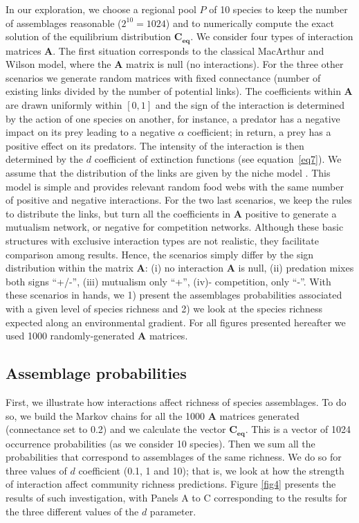 In our exploration, we choose a regional pool $P$ of 10 species to keep the number of assemblages reasonable ($2^{10}=1024$) and to numerically compute the exact solution of the equilibrium distribution $\mathbf{C_{eq}}$. We consider four types of interaction matrices $\mathbf{A}$. The first situation corresponds to the classical MacArthur and Wilson model, where the $\mathbf{A}$ matrix is null (no interactions). For the three other scenarios we generate random matrices with fixed connectance (number of existing links divided by the number of potential links). The coefficients within $\mathbf{A}$ are drawn uniformly within $[0,1]$ and the sign of the interaction is determined by the action of one species on another, for instance, a predator has a negative impact on its prey leading to a negative $\alpha$ coefficient; in return, a prey has a positive effect on its predators. The intensity of the interaction is then determined by the $d$ coefficient of extinction functions (see equation~\eqref{eq7}). We assume that the distribution of the links are given by the niche model \citep{Williams2000Simple}. This model is simple and provides relevant random food webs with the same number of positive and negative interactions. For the two last scenarios, we keep the rules to distribute the links, but turn all the coefficients in $\mathbf{A}$ positive to generate a mutualism network, or negative for competition networks. Although these basic structures with exclusive interaction types are not realistic, they facilitate comparison among results. Hence, the scenarios simply differ by the sign distribution within the matrix $\mathbf{A}$: (i) no interaction $\mathbf{A}$ is null, (ii) predation mixes both signs ``+/-'', (iii) mutualism only ``+'', (iv)- competition, only ``-''. With these scenarios in hands, we 1) present the assemblages probabilities associated with a given level of species richness and 2) we look at the species richness expected along an environmental gradient. For all figures presented hereafter we used 1000 randomly-generated $\mathbf{A}$ matrices.

\subsection*{Assemblage probabilities}

First, we illustrate how interactions affect richness of species assemblages. To do so, we build the Markov chains for all the 1000 $\mathbf{A}$ matrices generated (connectance set to 0.2) and we calculate the vector $\mathbf{C_{eq}}$. This is a vector of 1024 occurrence probabilities (as we consider 10 species). Then we sum all the probabilities that correspond to assemblages of the same richness. We do so for three values of $d$ coefficient (0.1, 1 and 10); that is, we look at how the strength of interaction affect community richness predictions. Figure \ref{fig4} presents the results of such investigation, with Panels A to C corresponding to the results for the three different values of the $d$ parameter.

